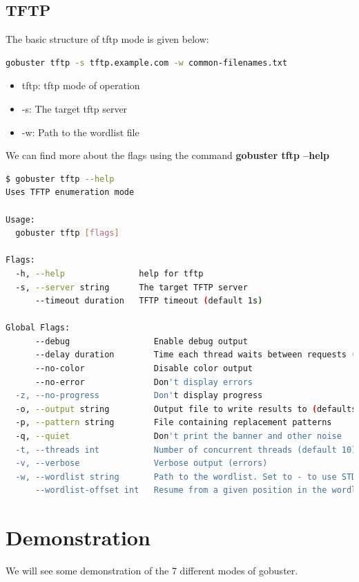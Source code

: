 \documentclass[12 pt]{article}
\begin{document}
\subsection{TFTP}
The basic structure of tftp mode is given below:
\begin{lstlisting}[language=bash]
gobuster tftp -s tftp.example.com -w common-filenames.txt
\end{lstlisting}
\begin{itemize}
    \item tftp: tftp mode of operation
    \item -s: The target tftp server 
    \item -w: Path to the wordlist file
\end{itemize}
We can find more about the flags using the command \textbf{gobuster tftp --help}
\begin{lstlisting}[language=bash]
$ gobuster tftp --help
Uses TFTP enumeration mode

Usage:
  gobuster tftp [flags]

Flags:
  -h, --help               help for tftp
  -s, --server string      The target TFTP server
      --timeout duration   TFTP timeout (default 1s)

Global Flags:
      --debug                 Enable debug output
      --delay duration        Time each thread waits between requests (e.g. 1500ms)
      --no-color              Disable color output
      --no-error              Don't display errors
  -z, --no-progress           Don't display progress
  -o, --output string         Output file to write results to (defaults to stdout)
  -p, --pattern string        File containing replacement patterns
  -q, --quiet                 Don't print the banner and other noise
  -t, --threads int           Number of concurrent threads (default 10)
  -v, --verbose               Verbose output (errors)
  -w, --wordlist string       Path to the wordlist. Set to - to use STDIN.
      --wordlist-offset int   Resume from a given position in the wordlist (defaults to 0)
\end{lstlisting}

\section{Demonstration}
We will see some demonstration of the 7 different modes of gobuster.
\end{document}
